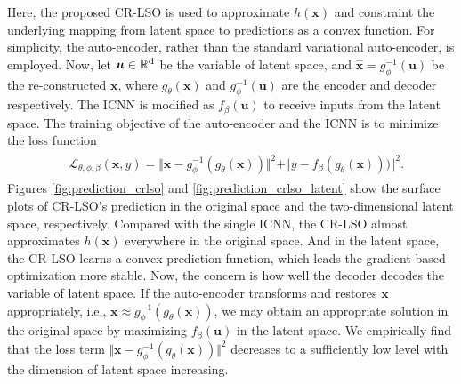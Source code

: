 \documentclass[10pt,twocolumn,letterpaper]{article}
\begin{document}
Here, the proposed CR-LSO is used to approximate $h(\boldsymbol{x})$ and constraint the underlying mapping from latent space to predictions as a convex function. For simplicity, the auto-encoder, rather than the standard variational auto-encoder, is employed. Now, let $\boldsymbol{u}\in \mathbb{R}^{\rm d}$ be the variable of latent space, and $\hat{\boldsymbol{x}} = g^{-1}_{\phi}(\boldsymbol{u})$ be the re-constructed $\boldsymbol{x}$, where $g_{\theta}(\boldsymbol{x})$ and $g^{-1}_{\phi}(\boldsymbol{u})$ are the encoder and decoder respectively. The ICNN is modified as $f_{\beta}(\boldsymbol{u})$ to receive inputs from the latent space. The training objective of the auto-encoder and the ICNN is to minimize the loss function 
\begin{align}
	\begin{split}
		& \mathcal{L}_{\theta,\phi,\beta}(\boldsymbol{x},y) =  \Vert \boldsymbol{x} - g_{\phi}^{-1}(g_{\theta}(\boldsymbol{x}))\Vert^{2} + \Vert y - f_{\beta}(g_{\theta}(\boldsymbol{x}))) \Vert^{2}.
	\end{split}
\end{align}
Figures \ref{fig:prediction_crlso} and \ref{fig:prediction_crlso_latent} show the surface plots of CR-LSO's prediction in the original space and the two-dimensional latent space, respectively. Compared with the single ICNN, the CR-LSO almost approximates $h(\boldsymbol{x})$ everywhere in the original space. And in the latent space, the CR-LSO learns a convex prediction function, which leads the gradient-based optimization more stable. Now, the concern is how well the decoder decodes the variable of latent space. If the auto-encoder transforms and restores $\boldsymbol{x}$ appropriately, i.e., $\boldsymbol{x} \approx g_{\phi}^{-1}(g_{\theta}(\boldsymbol{x}))$, we may obtain an appropriate solution in the original space by maximizing $f_{\beta}(\boldsymbol{u})$ in the latent space. We empirically find that the loss term $\Vert \boldsymbol{x} - g_{\phi}^{-1}(g_{\theta}(\boldsymbol{x}))\Vert^{2}$ decreases to a sufficiently low level with the dimension of latent space increasing. 
\end{document}
